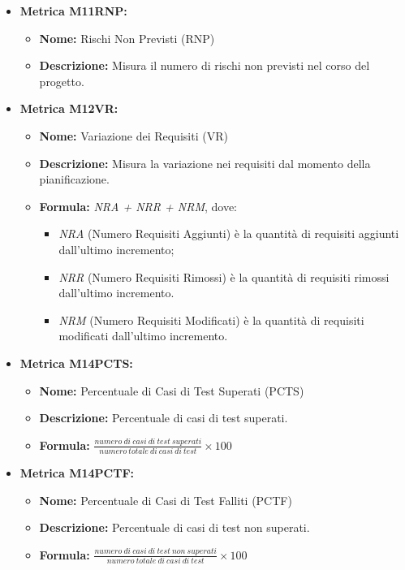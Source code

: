\begin{itemize}
    \item \textbf{Metrica M11RNP:}
          \begin{itemize}
              \item \textbf{Nome:} Rischi Non Previsti (RNP)
              \item \textbf{Descrizione:} Misura il numero di rischi non previsti nel corso del progetto.
          \end{itemize}

    \item \textbf{Metrica M12VR:}
          \begin{itemize}
              \item \textbf{Nome:} Variazione dei Requisiti (VR)
              \item \textbf{Descrizione:} Misura la variazione nei requisiti dal momento della pianificazione.
              \item \textbf{Formula:} \textit{NRA + NRR + NRM}, dove:\begin{itemize}
                \item \textit{NRA} (Numero Requisiti Aggiunti) è la quantità di requisiti aggiunti dall'ultimo incremento;
                \item \textit{NRR} (Numero Requisiti Rimossi) è la quantità di requisiti rimossi dall'ultimo incremento.
                \item \textit{NRM} (Numero Requisiti Modificati) è la quantità di requisiti modificati dall'ultimo incremento.
              \end{itemize}
          \end{itemize}
    
    \item \textbf{Metrica M14PCTS:}
          \begin{itemize}
           \item \textbf{Nome:} Percentuale di Casi di Test Superati (PCTS)
           \item \textbf{Descrizione:} Percentuale di casi di test superati.
           \item \textbf{Formula:} $\frac{numero \ di \ casi \ di \ test \ superati}{numero \ totale \ di \ casi \ di \ test}\times 100$
          \end{itemize}

    \item \textbf{Metrica M14PCTF:}
          \begin{itemize}
           \item \textbf{Nome:} Percentuale di Casi di Test Falliti (PCTF)
           \item \textbf{Descrizione:} Percentuale di casi di test non superati.
           \item \textbf{Formula:} $\frac{numero \ di \ casi \ di \ test \ non \ superati}{numero \ totale \ di \ casi \ di \ test}\times 100$
          \end{itemize}


\end{itemize}
